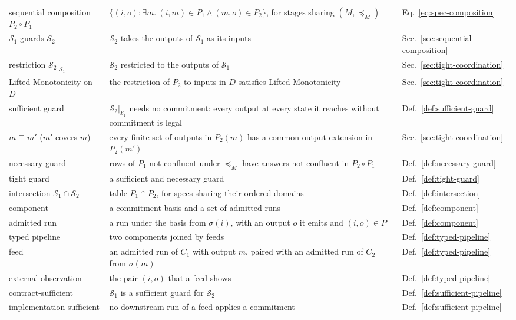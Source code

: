 \documentclass[sigconf]{cidr-2027}
\theoremstyle{remark}
\newcommand{\commitment}{commitment\xspace}
\newcommand{\outnoun}{output extension\xspace}%
\newcommand{\Spec}{\mathcal{S}}
\begin{document}
{\medskip
\noindent
\begin{tabular}{@{}>{\raggedright\arraybackslash}p{}>{\raggedright\arraybackslash}p{}>{\raggedright\arraybackslash}p{}@{}}
  \toprule
  \multicolumn{3}{@{}l}{\textbf{Composition (\S\ref{sec:composition})}}\\
  \midrule
  sequential composition $P_2\circ P_1$ & $\{(i,o):\exists m.\ (i,m)\in P_1\land(m,o)\in P_2\}$, for stages sharing $(M,\preceq_M)$ & Eq.~\ref{eq:spec-composition}\\
  $\Spec_1$ guards $\Spec_2$ & $\Spec_2$ takes the outputs of $\Spec_1$ as its inputs & Sec.~\ref{sec:sequential-composition}\\
  restriction $\Spec_2|_{\Spec_1}$ & $\Spec_2$ restricted to the outputs of $\Spec_1$ & Sec.~\ref{sec:tight-coordination}\\
  Lifted Monotonicity on $D$ & the restriction of $P_2$ to inputs in $D$ satisfies Lifted Monotonicity & Sec.~\ref{sec:tight-coordination}\\
  sufficient guard & $\Spec_2|_{\Spec_1}$ needs no \commitment: every output at every state it reaches without \commitment is legal & Def.~\ref{def:sufficient-guard}\\
    $m\sqsubseteq m'$ ($m'$ covers $m$) & every finite set of outputs in $P_2(m)$ has a common \outnoun in $P_2(m')$ & Sec.~\ref{sec:tight-coordination}\\
  necessary guard & rows of $P_1$ not confluent under $\preceq_M$ have answers not confluent in $P_2\circ P_1$ & Def.~\ref{def:necessary-guard}\\
  tight guard & a sufficient and necessary guard & Def.~\ref{def:tight-guard}\\
  intersection $\Spec_1\cap\Spec_2$ & table $P_1\cap P_2$, for specs sharing their ordered domains & Def.~\ref{def:intersection}\\
  component & a \commitment basis and a set of admitted runs & Def.~\ref{def:component}\\
  admitted run & a run under the basis from $\sigma(i)$, with an output $o$ it emits and $(i,o)\in P$ & Def.~\ref{def:component}\\
  typed pipeline & two components joined by feeds & Def.~\ref{def:typed-pipeline}\\
  feed & an admitted run of $C_1$ with output $m$, paired with an admitted run of $C_2$ from $\sigma(m)$ & Def.~\ref{def:typed-pipeline}\\
  external observation & the pair $(i,o)$ that a feed shows & Def.~\ref{def:typed-pipeline}\\
  contract-sufficient & $\Spec_1$ is a sufficient guard for $\Spec_2$ & Def.~\ref{def:sufficient-pipeline}\\
  implementation-sufficient & no downstream run of a feed applies a \commitment & Def.~\ref{def:sufficient-pipeline}\\
  \bottomrule
\end{tabular}

}
\end{document}
